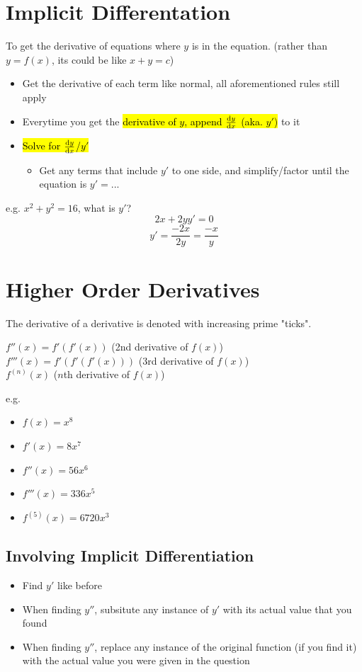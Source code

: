 \documentclass[a4paper,12pt]{article}
\begin{document}
\section{Implicit Differentation}
To get the derivative of equations where $y$ is in the equation. (rather than $y = f(x)$, its could be like $x + y = c$)

\begin{itemize}
    \item{Get the derivative of each term like normal, all aforementioned rules still apply}
    \item{Everytime you get the \hl{derivative of $y$, append $\dv{y}{x}$ (aka. $y'$)} to it}
    \item{
        \hl{Solve for $\dv{y}{x}$/$y'$}
        \begin{itemize}
            \item{Get any terms that include $y'$ to one side, and simplify/factor until the equation is $y' = ...$}
        \end{itemize}
    }
\end{itemize}

e.g. $x^2 + y^2 = 16$, what is $y'$?
$$2x + 2yy' = 0$$
$$y' = \frac{-2x}{2y} = \frac{-x}{y}$$

\section{Higher Order Derivatives}
The derivative of a derivative is denoted with increasing prime "ticks".
\begin{center}
    $f''(x) = f'(f'(x))$ (2nd derivative of $f(x)$)\\
    $f'''(x) = f'(f'(f'(x)))$ (3rd derivative of $f(x)$)\\
    $f^{(n)}(x)$ ($n$th derivative of $f(x)$)
\end{center}

e.g. 
\begin{itemize}
    \item{$f(x) = x^8$}
    \item{$f'(x) = 8x^7$}
    \item{$f''(x) = 56x^6$}
    \item{$f'''(x) = 336x^5$}
    \item{$f^{(5)}(x) = 6720x^3$}
\end{itemize}

\subsection{Involving Implicit Differentiation}
\begin{itemize}
    \item{Find $y'$ like before}
    \item{When finding $y''$, subsitute any instance of $y'$ with its actual value that you found}
    \item{When finding $y''$, replace any instance of the original function (if you find it) with the actual value you were given in the question}
\end{itemize}
\end{document}
